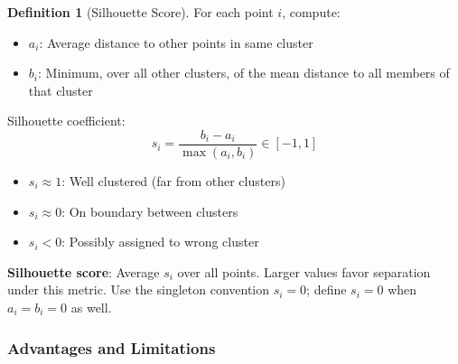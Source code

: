 \documentclass[11pt,twoside]{article}
\numberwithin{equation}{section}
\theoremstyle{plain}
\theoremstyle{definition}
\newtheorem{definition}[theorem]{Definition}
\theoremstyle{remark}
\begin{document}
\begin{definition}[Silhouette Score]
For each point $i$, compute:
\begin{itemize}
\item $a_i$: Average distance to other points in same cluster
\item $b_i$: Minimum, over all other clusters, of the mean distance to all members of that cluster
\end{itemize}
Silhouette coefficient:
\[
s_i = \frac{b_i - a_i}{\max(a_i, b_i)} \in [-1, 1]
\]
\begin{itemize}
\item $s_i \approx 1$: Well clustered (far from other clusters)
\item $s_i \approx 0$: On boundary between clusters
\item $s_i < 0$: Possibly assigned to wrong cluster
\end{itemize}

\textbf{Silhouette score}: Average $s_i$ over all points. Larger values favor separation under this metric. Use the singleton convention $s_i=0$; define $s_i=0$ when $a_i=b_i=0$ as well.
\end{definition}

\subsubsection{Advantages and Limitations}
\end{document}
